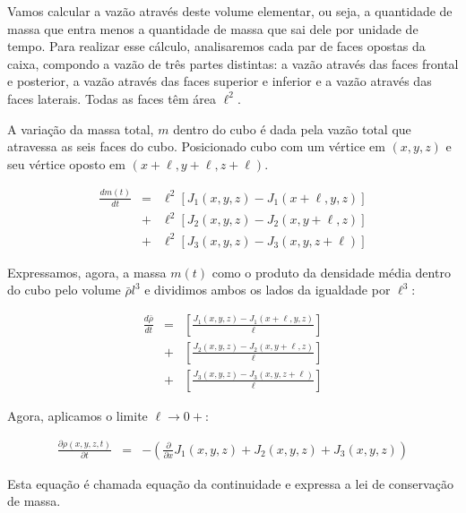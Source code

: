 Vamos calcular a vazão através deste volume elementar, ou seja, a quantidade de massa que entra menos a quantidade de massa que sai dele por unidade de tempo. Para realizar esse cálculo, analisaremos cada par de faces opostas da caixa, compondo a vazão de três partes distintas: a vazão através das faces frontal e posterior, a vazão através das faces superior e inferior e a vazão através das faces laterais. Todas as faces têm área $\ell^2$.

A variação da massa total, $m$ dentro do cubo é dada pela vazão total que atravessa as seis faces do cubo. Posicionado cubo com um vértice em $(x,y,z)$ e seu vértice oposto em $(x+\ell, y+\ell, z+\ell)$.

\begin{eqnarray*}
  \frac{d m(t)}{dt} &=&\ell^2 \left[J_1(x, y, z)-J_1(x+\ell, y, z)\right] \\
  &+& \ell^2 \left[J_2(x, y, z)-J_2(x, y+\ell, z)\right]\\
  &+& \ell^2 \left[J_3(x, y, z)-J_3(x, y, z+\ell)\right]
\end{eqnarray*}
  
Expressamos, agora, a massa $m(t)$ como o produto da densidade média dentro do cubo pelo volume $\bar{\rho} l^3$ e dividimos ambos os lados da igualdade por $\ell^3$:

\begin{eqnarray*}
  \frac{d \bar{\rho}}{d t} &=& \left[\frac{J_1(x, y, z)-J_1(x+\ell, y, z)}{\ell}\right] \\
  &+&  \left[\frac{J_2(x, y, z)-J_2(x, y+\ell, z)}{\ell}\right]\\
  &+&  \left[\frac{J_3(x, y, z)-J_3(x, y, z+\ell)}{\ell}\right]
\end{eqnarray*}

Agora, aplicamos o limite $\ell \to 0+$:

\begin{eqnarray*}
  \frac{\partial \rho(x,y,z,t)}{\partial t} &=& -\left(\frac{\partial}{\partial x}J_1(x, y, z)+J_2(x, y, z)+J_3(x, y, z)\right)
\end{eqnarray*}

Esta equação é chamada equação da continuidade e expressa a lei de conservação de massa.

